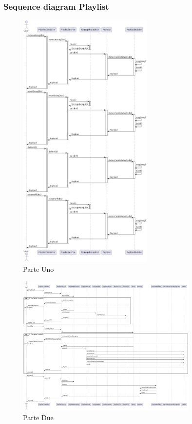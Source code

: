 \documentclass{article}
\begin{document}
		\subsubsection{Sequence diagram Playlist}
		\begin{figure}[H]
			\centering
			\includegraphics[width=0.6\textwidth]{Immagini/sequence1}
			\caption{Parte Uno}
		\end{figure}
		\begin{figure}[H]
			\centering
			\includegraphics[width=0.8\textwidth]{Immagini/sequence2}
			\caption{Parte Due}
		\end{figure}
\end{document}
